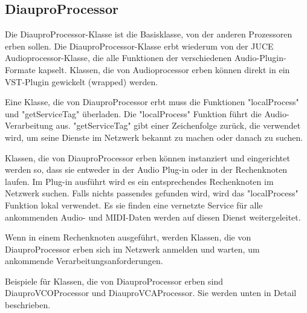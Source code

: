 \subsection{DiauproProcessor}

Die DiauproProcessor-Klasse ist die Basisklasse, von der anderen Prozessoren erben sollen. Die DiauproProcessor-Klasse erbt wiederum von der JUCE Audioprocessor-Klasse, die alle Funktionen der verschiedenen Audio-Plugin-Formate kapselt. Klassen, die von Audioprocessor erben können direkt in ein VST-Plugin gewickelt (wrapped) werden.

Eine Klasse, die von DiauproProcessor erbt muss die Funktionen "localProcess" und "getServiceTag" überladen. Die "localProcess" Funktion führt die Audio-Verarbeitung aus. "getServiceTag" gibt einer Zeichenfolge zurück, die verwendet wird, um seine Dienste im Netzwerk bekannt zu machen oder danach zu suchen.

Klassen, die von DiauproProcessor erben können instanziert und eingerichtet werden so, dass sie entweder in der Audio Plug-in oder in der Rechenknoten laufen. Im Plug-in ausführt wird es ein entsprechendes Rechenknoten im Netzwerk suchen. Falls nichts passendes gefunden wird, wird das "localProcess" Funktion lokal verwendet. Es sie finden eine vernetzte Service für alle ankommenden Audio- und MIDI-Daten werden auf diesen Dienst weitergeleitet.

Wenn in einem Rechenknoten ausgeführt, werden Klassen, die von DiauproProcessor erben sich im Netzwerk anmelden und warten, um ankommende Verarbeitungsanforderungen.

Beispiele für Klassen, die von DiauproProcessor erben sind DiauproVCOProcessor und DiauproVCAProcessor. Sie werden unten in Detail beschrieben.